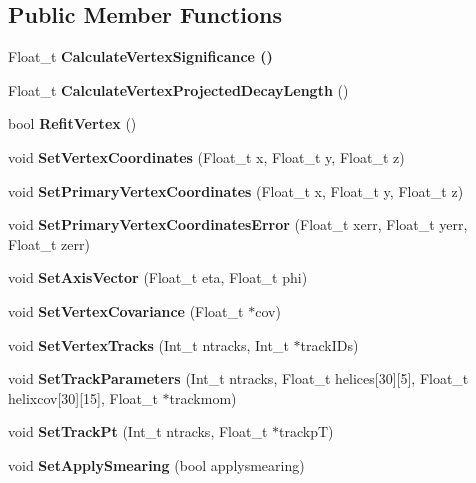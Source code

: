 \subsection*{Public Member Functions}
\begin{CompactItemize}
\item 
Float\_\-t \bf{Calculate\-Vertex\-Significance} ()
\item 
Float\_\-t \textbf{Calculate\-Vertex\-Projected\-Decay\-Length} ()\label{classTVertex_ecea9b286a92b095932469a7de3aa2bd}

\item 
bool \textbf{Refit\-Vertex} ()\label{classTVertex_c055f1e4fd242af667dc75b2ddc65510}

\item 
void \textbf{Set\-Vertex\-Coordinates} (Float\_\-t x, Float\_\-t y, Float\_\-t z)\label{classTVertex_16b8e7d29d338575a2a41e12d367c9b9}

\item 
void \textbf{Set\-Primary\-Vertex\-Coordinates} (Float\_\-t x, Float\_\-t y, Float\_\-t z)\label{classTVertex_d4d2a41f241a55909bb05c108c7964f2}

\item 
void \textbf{Set\-Primary\-Vertex\-Coordinates\-Error} (Float\_\-t xerr, Float\_\-t yerr, Float\_\-t zerr)\label{classTVertex_97aed75fcd394567e0948054645c62b2}

\item 
void \textbf{Set\-Axis\-Vector} (Float\_\-t eta, Float\_\-t phi)\label{classTVertex_fc11fe48446ef2441e3a234d69dad05e}

\item 
void \textbf{Set\-Vertex\-Covariance} (Float\_\-t $\ast$cov)\label{classTVertex_645430c92c46a8f846a5059e785b52dc}

\item 
void \textbf{Set\-Vertex\-Tracks} (Int\_\-t ntracks, Int\_\-t $\ast$track\-IDs)\label{classTVertex_9954866c3bc36cbc51db8c9a86498aa2}

\item 
void \textbf{Set\-Track\-Parameters} (Int\_\-t ntracks, Float\_\-t helices[30][5], Float\_\-t helixcov[30][15], Float\_\-t $\ast$trackmom)\label{classTVertex_64717d6257025b0530ef666d8fb88bf9}

\item 
void \textbf{Set\-Track\-Pt} (Int\_\-t ntracks, Float\_\-t $\ast$trackp\-T)\label{classTVertex_7130aa75c60198f05e60932f7b257ebd}

\item 
void \textbf{Set\-Apply\-Smearing} (bool applysmearing)\label{classTVertex_cc96dc73f2cf0773835285bf60c201c9}


\end{CompactItemize}
